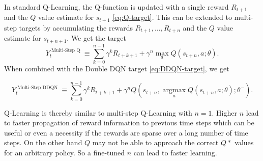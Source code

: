 
In standard Q-Learning, the Q-function is updated with a single reward $R_{t+1}$ and the $Q$ value estimate for $s_{t+1}$ \eqref{eq:Q-target}.
This can be extended to multi-step targets\cite{Sutton1988} by accumulating the rewards $R_{t+1},\dots,R_{t+n}$ and the $Q$ value estimate for $s_{t+n+1}$. We get the target
\begin{equation}
Y_{t}^{\text { Multi-Step Q }} \equiv \sum_{k=0}^{n-1} \gamma^k R_{t+k+1}+\gamma^n \max _{a} Q\left(s_{t+n}, a ; \theta\right).
\end{equation}
When combined with the Double DQN target \eqref{eq:DDQN-target}, we get 

\begin{equation}
Y_{t}^{\text { Multi-Step DDQN }} \equiv \sum_{k=0}^{n-1} \gamma^k R_{t+k+1}+\gamma^n Q\left(s_{t+n}, \underset{a}{\operatorname{argmax}} Q\left(s_{t+n}, a ; \theta\right); \theta^{-}\right).
\end{equation}

Q-Learning is thereby similar to multi-step Q-Learning with $n=1$. Higher $n$ lead to faster propagation of reward information to previous time steps which can be useful or even a necessity if the rewards are sparse over a long number of time steps. On the other hand $Q$ may not be able to approach the correct $Q*$ values for an arbitrary policy\cite{Peng1996}. So a fine-tuned $n$ can lead to faster learning.

